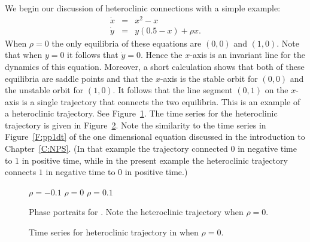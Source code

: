 \documentclass{ximera}
\begin{document}
We begin our discussion of heteroclinic connections with a simple example:
\begin{equation*} \label{e:hetero}
\begin{array}{rcl}
\dot{x} & = &  x^2-x  \\
\dot{y} & = &  y(0.5-x) + \rho x.
\end{array}
\end{equation*}
When $\rho=0$ the only equilibria of these equations are $(0,0)$ and 
$(1,0)$.  Note that when $y=0$ it follows that $\dot{y}=0$.  Hence
the $x$-axis is an invariant line for the dynamics of this equation. 
Moreover, a short calculation shows that both of these equilibria are 
saddle points and that the $x$-axis is the stable orbit for $(0,0)$
and the unstable orbit for $(1,0)$.  
It follows that the line segment 
$(0,1)$ on the $x$-axis is a single trajectory that connects the two
equilibria.  This is an example of a heteroclinic trajectory. See
Figure~\ref{F:hetero}.  The time series for the heteroclinic trajectory 
is given in Figure~\ref{F:heteroT}.  Note the similarity to the time 
series in Figure~\ref{F:pp1dt} of the one dimensional equation 
 discussed in the introduction to Chapter~\ref{C:NPS}. (In 
that example the trajectory connected $0$ in negative time to $1$ in positive
time, while in the present example the heteroclinic trajectory connects
$1$ in negative time to $0$ in positive time.)

\begin{figure}[htb]
           \centerline{%
	   }
 	\vspace*{-0.2in}
	\hspace{0.3in} $\rho=-0.1$  \hspace{1.7in} $\rho=0$
		\hspace{1.8in} $\rho=0.1$ 
           \caption{Phase portraits for \protect{}. 
	Note the heteroclinic trajectory when $\rho=0$.}
           \label{F:hetero}
\end{figure}

\begin{figure}[htb]
           \centerline{%
	   }
           \caption{Time series for heteroclinic trajectory 
		in \protect{} when $\rho=0$.}
           \label{F:heteroT}
\end{figure}
\end{document}
